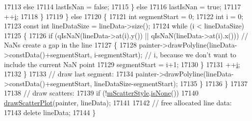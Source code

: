 \begin{DoxyCode}
17113           \textcolor{keywordflow}{else}
17114             lastIsNan = \textcolor{keyword}{false};
17115         \} \textcolor{keywordflow}{else}
17116           lastIsNan = \textcolor{keyword}{true};
17117         ++\hyperlink{_comparision_pictures_2_createtest_image_8m_a6f6ccfcf58b31cb6412107d9d5281426}{i};
17118       \}
17119     \} \textcolor{keywordflow}{else}
17120     \{
17121       \textcolor{keywordtype}{int} segmentStart = 0;
17122       \textcolor{keywordtype}{int} i = 0;
17123       \textcolor{keyword}{const} \textcolor{keywordtype}{int} lineDataSize = lineData->size();
17124       \textcolor{keywordflow}{while} (i < lineDataSize)
17125       \{
17126         \textcolor{keywordflow}{if} (qIsNaN(lineData->at(i).y()) || qIsNaN(lineData->at(i).x())) \textcolor{comment}{// NaNs create a gap in the line}
17127         \{
17128           painter->drawPolyline(lineData->constData()+segmentStart, i-segmentStart); \textcolor{comment}{// i, because we don't
       want to include the current NaN point}
17129           segmentStart = i+1;
17130         \}
17131         ++\hyperlink{_comparision_pictures_2_createtest_image_8m_a6f6ccfcf58b31cb6412107d9d5281426}{i};
17132       \}
17133       \textcolor{comment}{// draw last segment:}
17134       painter->drawPolyline(lineData->constData()+segmentStart, lineDataSize-segmentStart);
17135     \}
17136   \}
17137   
17138   \textcolor{comment}{// draw scatters:}
17139   \textcolor{keywordflow}{if} (!\hyperlink{class_q_c_p_curve_a08f803b4a30b01bbd7a1eab15d0f864f}{mScatterStyle}.\hyperlink{class_q_c_p_scatter_style_aa3861281108d0adbeb291c820ea3925c}{isNone}())
17140     \hyperlink{class_q_c_p_curve_a45593f30b81beec4b6130b6b53306087}{drawScatterPlot}(painter, lineData);
17141   
17142   \textcolor{comment}{// free allocated line data:}
17143   \textcolor{keyword}{delete} lineData;
17144 \}
\end{DoxyCode}


